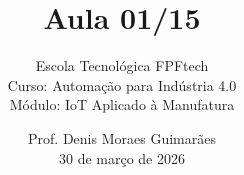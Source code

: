 
\title{Aula 01/15}

\subtitle{
\vspace{1.0cm}
Escola Tecnológica FPFtech\\
\vspace{0.5cm}
Curso: Automação para Indústria 4.0\\
\vspace{0.5cm}
Módulo: IoT Aplicado à Manufatura
\vspace{1.0cm}
}

\author{
Prof. Denis Moraes Guimarães\\
\small 30 de março de 2026
}

\date{}